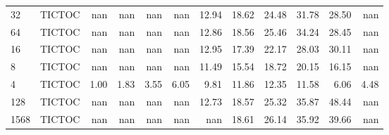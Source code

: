 \begin{tabular}{llrrrrrrrrrr}
32   & TICTOC &  nan &  nan &  nan &  nan & 12.94 & 18.62 & 24.48 & 31.78 & 28.50 &  nan \\
64   & TICTOC &  nan &  nan &  nan &  nan & 12.86 & 18.56 & 25.46 & 34.24 & 28.45 &  nan \\
16   & TICTOC &  nan &  nan &  nan &  nan & 12.95 & 17.39 & 22.17 & 28.03 & 30.11 &  nan \\
8    & TICTOC &  nan &  nan &  nan &  nan & 11.49 & 15.54 & 18.72 & 20.15 & 16.15 &  nan \\
4    & TICTOC & 1.00 & 1.83 & 3.55 & 6.05 &  9.81 & 11.86 & 12.35 & 11.58 &  6.06 & 4.48 \\
128  & TICTOC &  nan &  nan &  nan &  nan & 12.73 & 18.57 & 25.32 & 35.87 & 48.44 &  nan \\
1568 & TICTOC &  nan &  nan &  nan &  nan &   nan & 18.61 & 26.14 & 35.92 & 39.66 &  nan \\
\bottomrule
\end{tabular}
